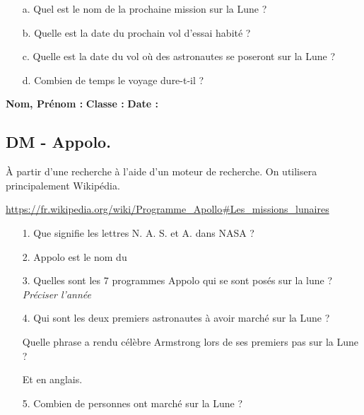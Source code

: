 \begin{enumerate}
  \item[a.] Quel est le nom de la prochaine mission sur la Lune ? \dotfill
  \item[b.] Quelle est la date du prochain vol d'essai habité ? \dotfill
  \item[c.] Quelle est la date du vol où des astronautes se poseront sur la Lune ?  \dotfill
  \item[d.] Combien de temps le voyage dure-t-il ? \dotfill
\end{enumerate}

\newpage

\textbf{Nom, Prénom :} \hspace{8cm} \textbf{Classe :} \hspace{3cm} \textbf{Date :}\\

\subsection*{DM - Appolo.}

À partir d'une recherche à l'aide d'un moteur de recherche. On utilisera principalement Wikipédia.

\url{https://fr.wikipedia.org/wiki/Programme_Apollo#Les_missions_lunaires}


\begin{enumerate}
  \item[1.]Que signifie les lettres N. A. S. et A. dans NASA ? \\
  \Pointilles[2]

  \item[2.]Appolo est le nom du \dotfill
  
  \item[3.]Quelles sont les 7 programmes Appolo qui se sont posés sur la lune ? \textit{Préciser l'année} \\
  \Pointilles[4]

  \item[4.]Qui sont les deux premiers astronautes à avoir marché sur la Lune ? \\
  \Pointilles[1]

  Quelle phrase a rendu célèbre Armstrong lors de ses premiers pas sur la Lune ? \\
  \Pointilles[2]

  Et en anglais. \\
  \Pointilles[2]

  \item[5.]Combien de personnes ont marché sur la Lune ? \\
  \Pointilles[3]
\end{enumerate}


